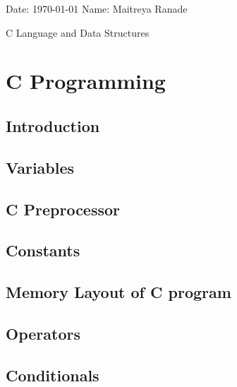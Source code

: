 \documentclass[12pt, a4paper]{report}
\begin{document}
	\onehalfspacing
	Date: \today{} \hfill{} Name: Maitreya Ranade
	\begin{center}
		\vspace*{\fill}
		{\LARGE C Language and Data Structures} \\
		\vspace*{\fill}
	\end{center}
	
	\pagebreak
	\singlespacing
	\tableofcontents
	\pagebreak
	
    \chapter{C Programming}

    \section{Introduction}
    
    \clearpage
    
    \section{Variables}
    
    \clearpage

    \section{C Preprocessor}
    
    \clearpage  

    \section{Constants}
    
    \clearpage  

    \section{Memory Layout of C program}
    
    \clearpage  

    \section{Operators}
    
    \clearpage
    
    \section{Conditionals}
    
    \clearpage
    
\end{document}
